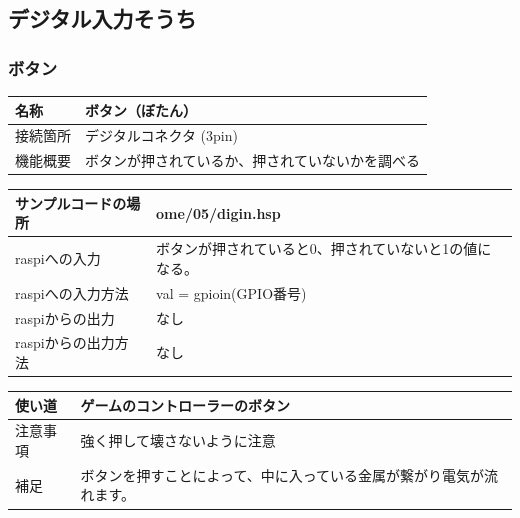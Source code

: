 \subsection{デジタル入力そうち}
\subsubsection{ボタン}\label{button}
\begin{table}[H]
	\begin{tabular}{|p{\colF}|p{\colG}|}	\hline
	名称 & ボタン（ぼたん）\\ \hline
	接続箇所 & デジタルコネクタ (3pin)\\ \hline
	機能概要 & ボタンが押されているか、押されていないかを調べる\\ \hline
  \end{tabular}
\end{table}

\begin{table}[H]
	\begin{tabular}{|p{\colF}|p{\colG}|}	\hline
	サンプルコードの場所 & ome/05/digin.hsp\\ \hline
	raspiへの入力 & ボタンが押されていると0、押されていないと1の値になる。\\ \hline
	raspiへの入力方法 & val = gpioin(GPIO番号)\\ \hline
	raspiからの出力 & なし\\ \hline
	raspiからの出力方法 & なし\\ \hline
  \end{tabular}
\end{table}

\begin{table}[H]
	\begin{tabular}{|p{\colF}|p{\colG}|} \hline
	使い道 & ゲームのコントローラーのボタン\\ \hline
	注意事項 & 強く押して壊さないように注意\\ \hline
	補足 & ボタンを押すことによって、中に入っている金属が繋がり電気が流れます。\\ \hline
  \end{tabular}
\end{table}


